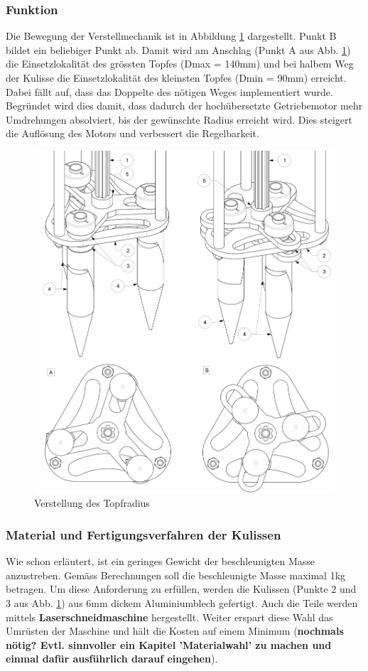 \subsubsection{Funktion}
Die Bewegung der Verstellmechanik ist in Abbildung \ref{fig:motion_vm} dargestellt. Punkt B bildet ein beliebiger Punkt ab. Damit wird am Anschlag (Punkt A aus Abb. \ref{fig:motion_vm}) die Einsetzlokalität des grössten Topfes (Dmax = 140mm) und bei halbem Weg der Kulisse die Einsetzlokalität des kleinsten Topfes (Dmin = 90mm) erreicht. Dabei fällt auf, dass das Doppelte des nötigen Weges implementiert wurde. Begründet wird dies damit, dass dadurch der hochübersetzte Getriebemotor mehr Umdrehungen absolviert, bis der gewünschte Radius erreicht wird. Dies steigert die Auflösung des Motors und verbessert die Regelbarkeit.
	\begin{figure}[H]
	\includegraphics[scale=0.53]{Illustrationen/6-Umsetzung/motion_vm.jpg}
	\caption{Verstellung des Topfradius}
	\label{fig:motion_vm}
	\end{figure}
\subsubsection{Material und Fertigungsverfahren der Kulissen}
Wie schon erläutert, ist ein geringes Gewicht der beschleunigten Masse anzustreben. Gemäss Berechnungen soll die beschleunigte Masse maximal 1kg betragen. Um diese Anforderung zu erfüllen, werden die Kulissen (Punkte 2 und 3 aus Abb. \ref{fig:motion_vm}) aus 6mm dickem Aluminiumblech gefertigt. Auch die Teile werden mittels \textbf{Laserschneidmaschine} hergestellt. Weiter erspart diese Wahl das Umrüsten der Maschine und hält die Kosten auf einem Minimum (\textbf{nochmals nötig? Evtl. sinnvoller ein Kapitel 'Materialwahl' zu machen und einmal dafür ausführlich darauf eingehen}).

